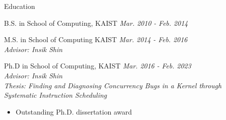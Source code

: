 
\begin{rSection}{Education}

B.S. in School of Computing, KAIST \hfill {\em Mar. 2010 - Feb. 2014}

M.S. in School of Computing KAIST \hfill {\em Mar. 2014 - Feb. 2016} \\
\textit{Advisor: Insik Shin}

Ph.D in School of Computing, KAIST \hfill {\em Mar. 2016 - Feb. 2023} \\
\textit{Advisor: Insik Shin} \\
\textit{Thesis: Finding and Diagnosing Concurrency Bugs in a Kernel through Systematic Instruction Scheduling}

\begin{itemize}
  \item{Outstanding Ph.D. dissertation award}
\end{itemize}

\end{rSection}
